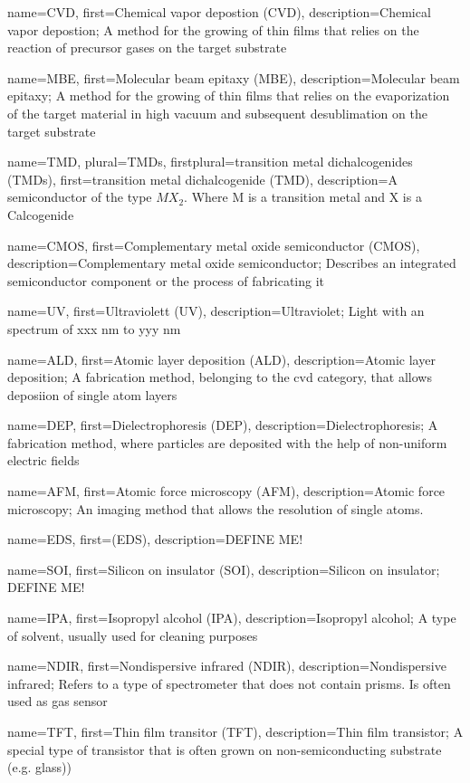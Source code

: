 {
    name={CVD},
    first={Chemical vapor depostion (CVD)},
    description={Chemical vapor depostion; A method for the growing of thin films that relies on the reaction of precursor gases on the target substrate}
}

{
    name={MBE},
    first={Molecular beam epitaxy (MBE)},
    description={Molecular beam epitaxy; A method for the growing of thin films that relies on the evaporization of the target material in high vacuum and subsequent desublimation on the target substrate}
}

{
    name={TMD},
    plural={TMDs},
    firstplural={transition metal dichalcogenides (TMDs)},
    first={transition metal dichalcogenide (TMD)},
    description={A semiconductor of the type $MX_{2}$. Where M is a transition metal and X is a Calcogenide}
}

{
    name={CMOS},
    first={Complementary metal oxide semiconductor (CMOS)},
    description={Complementary metal oxide semiconductor; Describes an integrated semiconductor component or the process of fabricating it}
}

{
    name={UV},
    first={Ultraviolett (UV)},
    description={Ultraviolet; Light with an spectrum of xxx nm to yyy nm}
}

{
    name={ALD},
    first={Atomic layer deposition (ALD)},
    description={Atomic layer deposition; A fabrication method, belonging to the \gls{cvd} category, that allows deposiion of single atom layers}
}

{
    name={DEP},
    first={Dielectrophoresis (DEP)},
    description={Dielectrophoresis; A fabrication method, where particles are deposited with the help of non-uniform electric fields}
}

{
    name={AFM},
    first={Atomic force microscopy (AFM)},
    description={Atomic force microscopy; An imaging method that allows the resolution of single atoms.}
}

{
    name={EDS},
    first={(EDS)},
    description={DEFINE ME!}
}

{
    name={SOI},
    first={Silicon on insulator (SOI)},
    description={Silicon on insulator; DEFINE ME!}
}

{
    name={IPA},
    first={Isopropyl alcohol (IPA)},
    description={Isopropyl alcohol; A type of solvent, usually used for cleaning purposes}
}

{
    name={NDIR},
    first={Nondispersive infrared (NDIR)},
    description={Nondispersive infrared; Refers to a type of spectrometer that does not contain prisms. Is often used as gas sensor}
}

{
    name={TFT},
    first={Thin film transitor (TFT)},
    description={Thin film transistor; A special type of transistor that is often grown on non-semiconducting substrate (e.g. glass))}
}
